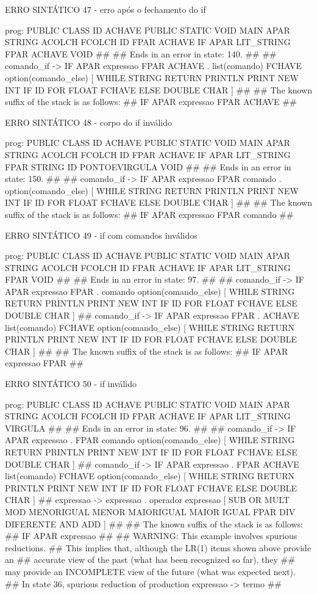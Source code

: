 \documentclass[12pt,a4paper,twoside]{report}
\begin{document}
\begin{terminal}
{ERRO SINTÁTICO 47 - erro após o fechamento do if

prog: PUBLIC CLASS ID ACHAVE PUBLIC STATIC VOID MAIN APAR STRING ACOLCH FCOLCH ID FPAR ACHAVE IF APAR LIT_STRING FPAR ACHAVE VOID 
##
## Ends in an error in state: 140.
##
## comando_if -> IF APAR expressao FPAR ACHAVE . list(comando) FCHAVE option(comando_else) [ WHILE STRING RETURN PRINTLN PRINT NEW INT IF ID FOR FLOAT FCHAVE ELSE DOUBLE CHAR ]
##
## The known suffix of the stack is as follows:
## IF APAR expressao FPAR ACHAVE 
##

ERRO SINTÁTICO 48 - corpo do if inválido

prog: PUBLIC CLASS ID ACHAVE PUBLIC STATIC VOID MAIN APAR STRING ACOLCH FCOLCH ID FPAR ACHAVE IF APAR LIT_STRING FPAR STRING ID PONTOEVIRGULA VOID 
##
## Ends in an error in state: 150.
##
## comando_if -> IF APAR expressao FPAR comando . option(comando_else) [ WHILE STRING RETURN PRINTLN PRINT NEW INT IF ID FOR FLOAT FCHAVE ELSE DOUBLE CHAR ]
##
## The known suffix of the stack is as follows:
## IF APAR expressao FPAR comando 
##

ERRO SINTÁTICO 49 - if com comandos inválidos

prog: PUBLIC CLASS ID ACHAVE PUBLIC STATIC VOID MAIN APAR STRING ACOLCH FCOLCH ID FPAR ACHAVE IF APAR LIT_STRING FPAR VOID 
##
## Ends in an error in state: 97.
##
## comando_if -> IF APAR expressao FPAR . comando option(comando_else) [ WHILE STRING RETURN PRINTLN PRINT NEW INT IF ID FOR FLOAT FCHAVE ELSE DOUBLE CHAR ]
## comando_if -> IF APAR expressao FPAR . ACHAVE list(comando) FCHAVE option(comando_else) [ WHILE STRING RETURN PRINTLN PRINT NEW INT IF ID FOR FLOAT FCHAVE ELSE DOUBLE CHAR ]
##
## The known suffix of the stack is as follows:
## IF APAR expressao FPAR 
##

ERRO SINTÁTICO 50 - if inválido

prog: PUBLIC CLASS ID ACHAVE PUBLIC STATIC VOID MAIN APAR STRING ACOLCH FCOLCH ID FPAR ACHAVE IF APAR LIT_STRING VIRGULA 
##
## Ends in an error in state: 96.
##
## comando_if -> IF APAR expressao . FPAR comando option(comando_else) [ WHILE STRING RETURN PRINTLN PRINT NEW INT IF ID FOR FLOAT FCHAVE ELSE DOUBLE CHAR ]
## comando_if -> IF APAR expressao . FPAR ACHAVE list(comando) FCHAVE option(comando_else) [ WHILE STRING RETURN PRINTLN PRINT NEW INT IF ID FOR FLOAT FCHAVE ELSE DOUBLE CHAR ]
## expressao -> expressao . operador expressao [ SUB OR MULT MOD MENORIGUAL MENOR MAIORIGUAL MAIOR IGUAL FPAR DIV DIFERENTE AND ADD ]
##
## The known suffix of the stack is as follows:
## IF APAR expressao 
##
## WARNING: This example involves spurious reductions.
## This implies that, although the LR(1) items shown above provide an
## accurate view of the past (what has been recognized so far), they
## may provide an INCOMPLETE view of the future (what was expected next).
## In state 36, spurious reduction of production expressao -> termo 
##

}
\end{terminal}
\end{document}
